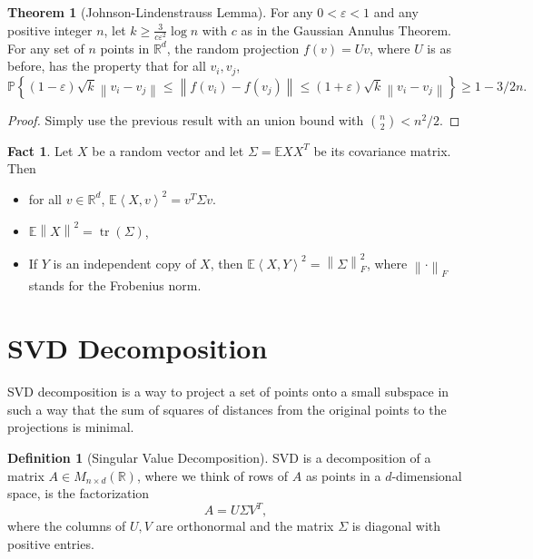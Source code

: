 \documentclass{article}
\theoremstyle{definition}
\newtheorem{theorem}{Theorem}[section]
\newtheorem{definition}{Definition}[section]
\newtheorem{fact}{Fact}[section]
\begin{document}
  \begin{theorem}[Johnson-Lindenstrauss Lemma]
    For any \( 0 < \varepsilon < 1 \) and any positive integer \( n \),
    let \( k \geq \frac{3}{c \varepsilon^2} \log n \) with \( c \) as
    in the Gaussian Annulus Theorem. For any set of \( n \) points in
    \( \mathbb{R}^d \), the random projection \( f(v) = Uv \), where
    \( U \) is as before, has the property that for all \( v_{i}, v_{j} \),
    \[
      \mathbb{P}\left\{ (1-\varepsilon) \sqrt{k} \left\|v_{i} -
        v_{j}\right\| \leq \left\| f(v_{i}) - f(v_{j})\right\| \leq
      (1+\varepsilon) \sqrt{k} \left\|v_{i} - v_{j}\right\| \right\}
      \geq 1- 3/2n.
    \]
  \end{theorem}

  \begin{proof}
    Simply use the previous result with an union bound with \(
    \binom{n}{2} < n^{2}/2 \).
  \end{proof}

  \begin{fact}
    Let \( X \) be a random vector and let \( \Sigma = \mathbb{E}XX^T
    \) be its covariance matrix. Then
    \begin{itemize}
      \item for all \( v \in \mathbb{R}^d \), \( \mathbb{E}\left\langle
        X, v \right\rangle^2 = v^T \Sigma v \).
      \item \( \mathbb{E}\left\|X\right\|^2 = \operatorname{tr}(\Sigma) \),
      \item If \( Y \) is an independent copy of \( X \), then \(
          \mathbb{E}\left\langle X, Y \right\rangle^2 =
        \left\|\Sigma\right\|^{2}_{F} \), where \( \left\|\cdot\right\|_F \)
        stands for the Frobenius norm.
    \end{itemize}
  \end{fact}

  \section{SVD Decomposition}

  SVD decomposition is a way to project a set of points onto a small
  subspace in such a way that the sum of squares of distances from the
  original points to the projections is minimal.

  \begin{definition}[Singular Value Decomposition]
    SVD is a decomposition of a matrix \( A \in M_{n \times
    d}(\mathbb{R}) \), where we think of rows of \( A \) as points in
    a \( d \)-dimensional space, is the factorization
    \[
      A = U \Sigma V^{T},
    \]
    where the columns of \( U, V \) are orthonormal and the matrix \(
    \Sigma \) is diagonal with positive entries.
  \end{definition}
\end{document}
